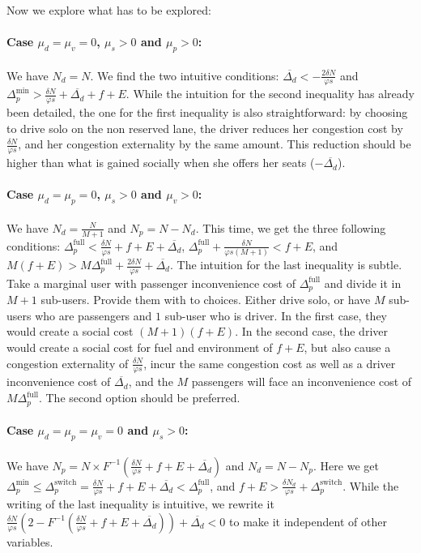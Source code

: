 \documentclass[english, a4paper]{article}
\theoremstyle{plain}
\theoremstyle{definition}
\theoremstyle{remark}
\begin{document}
Now we explore what has to be explored:
\paragraph{Case $\mu_d = \mu_v = 0$, $\mu_s > 0$ and $\mu_p >0$:} We have $N_d = N$. We find the two intuitive conditions: $\overline{\Delta _d} < -\frac{2\delta N}{\varphi s}$ and $\Delta _p^{\text{min}} > \frac{\delta N}{\varphi s} + \overline{\Delta_d} + f + E$. While the intuition for the second inequality has already been detailed, the one for the first inequality is also straightforward: by choosing to drive solo on the non reserved lane, the driver reduces her congestion cost by $\frac{\delta N}{\varphi s}$, and her congestion externality by the same amount. This reduction should be higher than what is gained socially when she offers her seats ($-\overline{\Delta_d}$).

\paragraph{Case $\mu_d = \mu_p = 0$, $\mu_s > 0$ and $\mu_v >0$:} We have $N_d = \frac{N}{M+1}$ and $N_p = N - N_d$. This time, we get the three following conditions: $\Delta_p^{\text{full}} < \frac{\delta N}{\varphi s} + f + E + \overline{\Delta_d}$, $\Delta_p^{\text{full}} + \frac{\delta N}{\varphi s (M+1)} < f+E$, and $M(f+E) > M\Delta _p^{\text{full}} + \frac{2 \delta N}{\varphi s}  + \overline{\Delta_d}$. The intuition for the last inequality is subtle. Take a marginal user with passenger inconvenience cost of $\Delta_p^{\text{full}}$ and divide it in $M+1$ sub-users. Provide them with to choices. Either drive solo, or have $M$ sub-users who are passengers and $1$ sub-user who is driver. In the first case, they would create a social cost $(M+1)(f+E)$. In the second case, the driver would create a social cost for fuel and environment of $f+E$, but also cause a congestion externality of $\frac{\delta N}{\varphi s}$, incur the same congestion cost as well as a driver inconvenience cost of $\overline{\Delta_d}$, and the $M$ passengers will face an inconvenience cost of $M\Delta_p^{\text{full}}$. The second option should be preferred.

\paragraph{Case $\mu_d = \mu_p = \mu_v = 0$ and $\mu_s >0$:} We have $N_p = N\times F^{-1} \left( \frac{\delta N}{\varphi s} + f + E + \overline{\Delta_d}\right)$ and $N_d = N - N_p$. Here we get $\Delta_p^{\text{min}} \leq \Delta_p^{\text{switch}} = \frac{\delta N}{\varphi s} + f + E + \overline{\Delta_d} < \Delta_p^{\text{full}}$, and $f+E > \frac{\delta N_d}{\varphi s} + \Delta_p^{\text{switch}}$. While the writing of the last inequality is intuitive, we rewrite it $\frac{\delta N}{\varphi s} \left( 2 - F^{-1} \left( \frac{\delta N}{\varphi s} + f + E + \overline{\Delta_d} \right) \right) + \overline{\Delta_d} < 0$ to make it independent of other variables.
\end{document}
